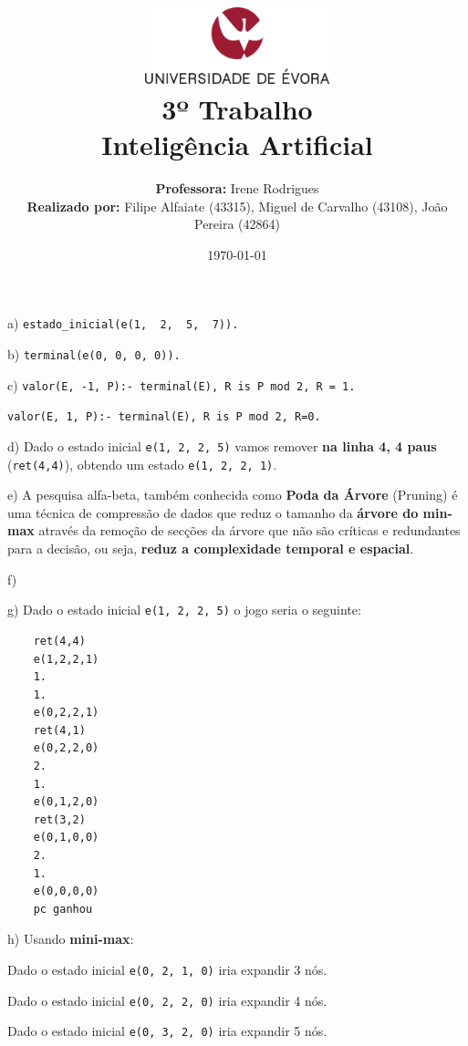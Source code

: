 \documentclass[11pt]{article}
\title
{
    \includegraphics[width=0.4\textwidth]{imgs/university.png}
    \\[0.1cm]
    \textbf{3º Trabalho} \\
    Inteligência Artificial
}
\author
{
    \textbf{Professora:} Irene Rodrigues \\
    \textbf{Realizado por:} Filipe Alfaiate (43315), Miguel de Carvalho (43108), João Pereira (42864) 
}
\date{\today}
\begin{document}
\maketitle

\section{}

\hspace{0,6cm}a) \verb|estado_inicial(e(1,  2,  5,  7)).|

b) \verb|terminal(e(0, 0, 0, 0)).|

c) \verb|valor(E, -1, P):- terminal(E), R is P mod 2, R = 1.|

\hspace{0,45cm}\verb|valor(E, 1, P):- terminal(E), R is P mod 2, R=0.|

d) Dado o estado inicial \verb|e(1, 2, 2, 5)| vamos remover \textbf{na linha 4, 4 paus}
(\verb|ret(4,4)|), obtendo um estado \verb|e(1, 2, 2, 1)|.

e) A pesquisa alfa-beta, também conhecida como \textbf{Poda da Árvore} (Pruning) é uma técnica
de compressão de dados que reduz o tamanho da \textbf{árvore do min-max} através da remoção de
secções da árvore que não são críticas e redundantes para a decisão, ou seja, \textbf{reduz a complexidade 
temporal e espacial}.

f)

g) Dado o estado inicial \verb|e(1, 2, 2, 5)| o jogo seria o seguinte:
\newline
\begin{lstlisting}
    ret(4,4)
    e(1,2,2,1)
    1.
    1.
    e(0,2,2,1)
    ret(4,1)
    e(0,2,2,0)
    2.
    1.
    e(0,1,2,0)
    ret(3,2)
    e(0,1,0,0)
    2.
    1.
    e(0,0,0,0)
    pc ganhou
\end{lstlisting}

\newpage

h) Usando \textbf{mini-max}:

\hspace{0,45cm}Dado o estado inicial \verb|e(0, 2, 1, 0)| iria expandir 3 nós.

\hspace{0,45cm}Dado o estado inicial \verb|e(0, 2, 2, 0)| iria expandir 4 nós.

\hspace{0,45cm}Dado o estado inicial \verb|e(0, 3, 2, 0)| iria expandir 5 nós.
\end{document}

